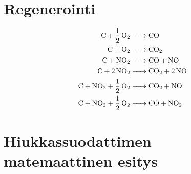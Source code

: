 \section{Regenerointi}
\begin{align*}
    \ce{C + 1/2 O2 &-> CO }\\
    \ce{C + O2 &-> CO2}\\
    \ce{C + NO2 &-> CO +  NO}  \\
    \ce{C + 2 NO2 &-> CO2 + 2 NO}  \\
    \ce{C + NO2 + 1/2 O2 &-> CO2 + NO}  \\
    \ce{C + NO2 + 1/2 O2 &-> CO + NO2} 
\end{align*}


\section{Hiukkassuodattimen matemaattinen esitys}

\begin{figure}[H]
    \centering 
    
    \caption{}
    \label{fig:blocks1}
\end{figure}
\cite{LiuGuanlin2021Roio}
